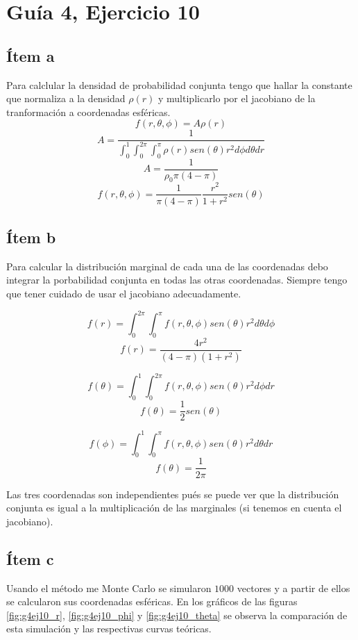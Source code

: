 \documentclass{article}
\begin{document}
\section{Guía 4, Ejercicio 10}

\subsection{Ítem a}
Para calclular la densidad de probabilidad conjunta tengo que hallar la constante que normaliza a la densidad $\rho(r)$ y multiplicarlo por el jacobiano de la tranformación a coordenadas esféricas.
$$f(r, \theta, \phi) = A \rho(r) $$
$$A = \frac{1}{\int_0^1 \int_0^{2\pi} \int_0^{\pi}\rho(r) sen(\theta) r^2 d\phi d\theta dr} $$
$$A = \frac{1}{\rho_0 \pi (4 - \pi)} $$
$$f(r, \theta, \phi) = \frac{1}{\pi (4 - \pi)} \frac{r^2}{1 + r^2} sen(\theta)$$

\subsection{Ítem b}
Para calcular la distribución marginal de cada una de las coordenadas debo integrar la porbabilidad conjunta en todas las otras coordenadas. Siempre tengo que tener cuidado de usar el jacobiano adecuadamente.

$$f(r) = \int_0^{2\pi}\int_0^{\pi} f(r, \theta, \phi) sen(\theta) r^2 d\theta d\phi$$
$$f(r) = \frac{4 r^2}{(4 - \pi) (1 + r^2)}$$

$$f(\theta) = \int_0^1 \int_0^{2\pi}  f(r, \theta, \phi) sen(\theta) r^2 d\phi dr$$
$$f(\theta) = \frac{1}{2} sen(\theta)$$

$$f(\phi) = \int_0^1 \int_0^{\pi}  f(r, \theta, \phi) sen(\theta) r^2 d\theta dr$$
$$f(\theta) = \frac{1}{2\pi}$$

Las tres coordenadas son independientes pués se puede ver que la distribución conjunta es igual a la multiplicación de las marginales (si tenemos en cuenta el jacobiano).

\subsection{Ítem c}

Usando el método me Monte Carlo se simularon $1000$ vectores y a partir de ellos se calcularon sus coordenadas esféricas.
En los gráficos de las figuras \ref{fig:g4ej10_r}, \ref{fig:g4ej10_phi} y \ref{fig:g4ej10_theta} se observa la comparación de esta simulación y las respectivas curvas teóricas. 
\end{document}
